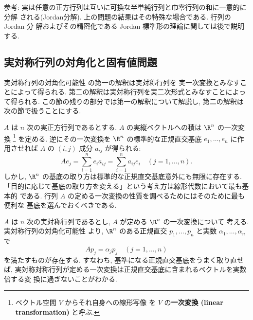 \documentclass[12pt,twoside]{jarticle}
\begin{document}
\noindent
参考: 実は任意の正方行列は互いに可換な半単純行列と巾零行列の和に一意的に分解
される(Jordan分解).  上の問題の結果はその特殊な場合である.  行列の Jordan 分
解およびその精密化である Jordan 標準形の理論に関しては後で説明する.


\subsection{実対称行列の対角化と固有値問題}
\label{sec:real-sym-eigen-val-problem}

実対称行列の対角化可能性  の第一の解釈は実対称行列を
実一次変換とみなすことによって得られる.
第二の解釈は実対称行列を実二次形式とみなすことによって得られる.
この節の残りの部分では第一の解釈について解説し, 
第二の解釈は次の節で扱うことにする.

$A$ は $n$ 次の実正方行列であるとする.  
$A$ の実縦ベクトルへの積は $\R^n$ の一次変換%
\footnote{ベクトル空間 $V$ からそれ自身への線形写像
  を $V$ の{\bf 一次変換 (linear transformation)} と呼ぶ.}%
を定める.  逆にその一次変換を $\R^n$ の標準的な正規直交基底 $e_1,\dots,e_n$ 
に作用させれば $A$ の $(i,j)$ 成分 $a_{ij}$ が得られる:
\begin{equation*}
  Ae_j = \sum_{i=1}^n e_i a_{ij} = \sum_{i=1}^n a_{ij} e_i
  \quad (j=1,\dots,n).
\end{equation*}
しかし, $\R^n$ の基底の取り方は標準的な正規直交基底意外にも無限に存在する.
「目的に応じて基底の取り方を変える」という考え方は線形代数において最も基本的
である.  行列 $A$ の定める一次変換の性質を調べるためにはそのために最も便利な
基底を選んでおくべきである.

$A$ は $n$ 次の実対称行列であるとし, $A$ が定める $\R^n$ の一次変換について
考える.  実対称行列の対角化可能性  より, 
$\R^n$ のある正規直交 $p_1,\dots,p_n$ と実数 $\alpha_1,\dots,\alpha_n$ で 
\begin{equation*}
  A p_j = \alpha_j p_j
  \quad (j=1,\dots,n)
\end{equation*}
を満たすものが存在する.  すなわち, 基準になる正規直交基底をうまく取り直せば,
実対称対称行列が定める一次変換は正規直交基底に含まれるベクトルを実数倍する変
換に過ぎないことがわかる.

\end{document}
